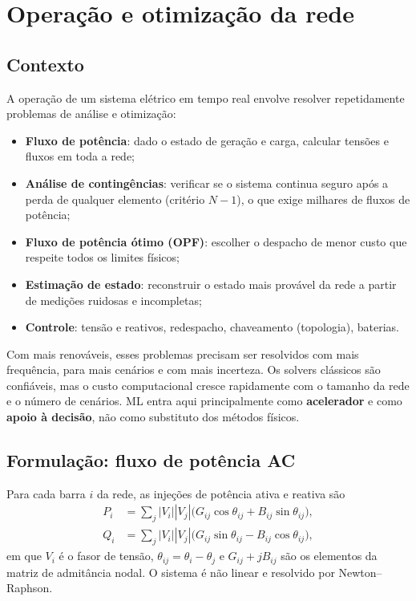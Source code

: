 \documentclass[11pt,a4paper]{article}
\begin{document}
\section{Operação e otimização da rede}

\subsection{Contexto}

A operação de um sistema elétrico em tempo real envolve resolver
repetidamente problemas de análise e otimização:
\begin{itemize}
  \item \textbf{Fluxo de potência}: dado o estado de geração e carga,
    calcular tensões e fluxos em toda a rede;
  \item \textbf{Análise de contingências}: verificar se o sistema continua
    seguro após a perda de qualquer elemento (critério $N-1$), o que exige
    milhares de fluxos de potência;
  \item \textbf{Fluxo de potência ótimo (OPF)}: escolher o despacho de menor
    custo que respeite todos os limites físicos;
  \item \textbf{Estimação de estado}: reconstruir o estado mais provável da
    rede a partir de medições ruidosas e incompletas;
  \item \textbf{Controle}: tensão e reativos, redespacho, chaveamento
    (topologia), baterias.
\end{itemize}

Com mais renováveis, esses problemas precisam ser resolvidos com mais
frequência, para mais cenários e com mais incerteza. Os solvers clássicos
são confiáveis, mas o custo computacional cresce rapidamente com o
tamanho da rede e o número de cenários. ML entra aqui principalmente como
\textbf{acelerador} e como \textbf{apoio à decisão}, não como substituto dos
métodos físicos.

\subsection{Formulação: fluxo de potência AC}

Para cada barra $i$ da rede, as injeções de potência ativa e reativa são
\begin{align}
  P_i &= \sum_{j} |V_i||V_j| \big(G_{ij}\cos\theta_{ij} + B_{ij}\sin\theta_{ij}\big), \\
  Q_i &= \sum_{j} |V_i||V_j| \big(G_{ij}\sin\theta_{ij} - B_{ij}\cos\theta_{ij}\big),
\end{align}
em que $V_i$ é o fasor de tensão, $\theta_{ij} = \theta_i - \theta_j$ e
$G_{ij} + jB_{ij}$ são os elementos da matriz de admitância nodal. O sistema é
não linear e resolvido por Newton--Raphson.
\end{document}
